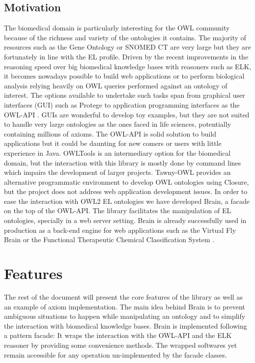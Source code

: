 \documentclass{llncs}
\begin{document}
\subsection{Motivation}
The biomedical domain is particularly interesting for the OWL community because of the richness and variety of the ontologies it contains.
The majority of resources such as the Gene Ontology \cite{Ashburner2000} or SNOMED CT \cite{snomed} are very large but they are fortunately in line with 
the EL profile.
Driven by the recent improvements in the reasoning speed over big biomedical knowledge bases with reasoners such as ELK,
it becomes nowadays possible to build web applications or to perform biological analysis relying heavily on OWL queries performed against
an ontology of interest. 
The options available to undertake such tasks span from graphical user interfaces (GUI) such as Protege \cite{protege} to application 
programming interfaces as
the OWL-API \cite{MatthewHorridge2011}. GUIs are wonderful to develop toy examples, but they are not suited to handle very large 
ontologies as the ones faced in life sciences, potentially containing millions of axioms. The OWL-API is solid solution to build
applications but it could be daunting for new comers or users with little experience in Java.
OWLTools \cite{owltools} is an intermediary option for the
biomedical domain, but the interaction with this library is mostly done by command lines which impairs the development of larger projects.
Tawny-OWL \cite{tawny} provides an alternative programmatic environment to develop OWL ontologies using Closure, but the project does
not address web application development issues.
In order to ease the interaction with OWL2 EL ontologies we have developed Brain, a facade on the top of the OWL-API. 
The library facilitates the manipulation of EL ontologies, specially in a web server setting. 
Brain is already successfully used in production as a back-end engine for web applications 
such as the Virtual Fly Brain \cite{vfb} or the Functional Therapeutic Chemical Classification System \cite{ftc}.

\section{Features}
The rest of the document will present the core features of the library as well as an example of axiom implementation.
The main idea behind Brain is to prevent ambiguous situations to happen while manipulating an ontology and to simplify 
the interaction with biomedical knowledge bases. Brain is implemented following a pattern facade: 
It wraps the interaction with the OWL-API and the ELK reasoner \cite{YevgenyKazakov2011} by providing some convenience methods.
The wrapped softwares yet remain accessible for any operation un-implemented by the facade classes.
\end{document}

